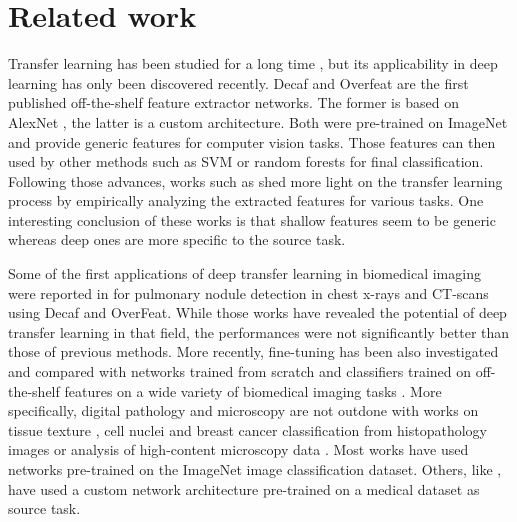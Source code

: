 \section{Related work}

Transfer learning has been studied for a long time \parencite{pan2010survey}, but its applicability in deep learning has only been discovered recently. Decaf \parencite{donahue2014decaf} and Overfeat \parencite{razavian2014cnn,sermanet2013overfeat} are the first published off-the-shelf feature extractor networks. The former is based on AlexNet \parencite{krizhevsky2012imagenet}, the latter is a custom architecture. Both were pre-trained on ImageNet and provide generic features for computer vision tasks. Those features can then used by other methods such as SVM \parencite{fan2008liblinear} or random forests \parencite{breiman2001random} for final classification. Following those advances, works such as \parencite{yosinski2014transferable,zeiler2014visualizing} shed more light on the transfer learning process by empirically analyzing the extracted features for various tasks. One interesting conclusion of these works is that shallow features seem to be generic whereas deep ones are more specific to the source task.

Some of the first applications of deep transfer learning in biomedical imaging were reported in \parencite{bar2015chest,ciompi2015automatic,van2015off} for pulmonary nodule detection in chest x-rays and CT-scans using Decaf and OverFeat. While those works have revealed the potential of deep transfer learning in that field, the performances were not significantly better than those of previous methods. More recently, fine-tuning has been also investigated and compared with networks trained from scratch and classifiers trained on off-the-shelf features on a wide variety of biomedical imaging tasks \parencite{antony2016quantifying,esteva2017dermatologist,gulshan2016development, ravishankar2016understanding,shin2016deep,tajbakhsh2016convolutional}. More specifically, digital pathology and microscopy are not outdone with works on tissue texture \parencite{kieffer2017convolutional}, cell nuclei \parencite{bayramoglu2016transfer} and breast cancer \parencite{han2017breast} classification from histopathology images or analysis of high-content microscopy data \parencite{kraus2017automated}. Most works have used networks pre-trained on the ImageNet image classification dataset. Others, like \parencite{kraus2017automated}, have used a custom network architecture pre-trained on a medical dataset as source task. 

